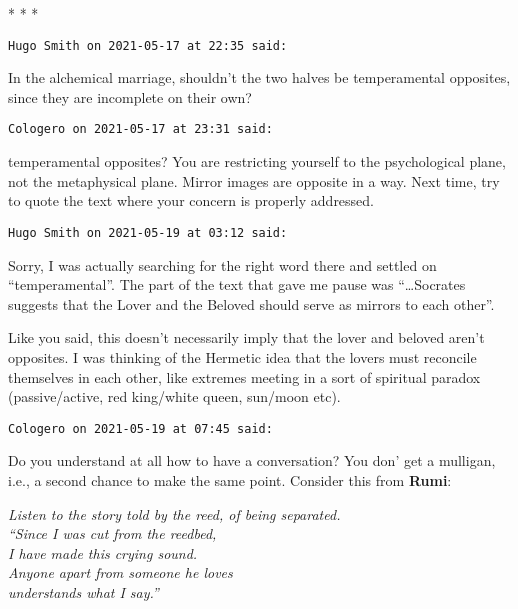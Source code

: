 
\begin{center}* * *\end{center}

\begin{footnotesize}\begin{sffamily}



\texttt{Hugo Smith on 2021-05-17 at 22:35 said: }

In the alchemical marriage, shouldn't the two halves be temperamental opposites, since they are incomplete on their own?


\hfill

\texttt{Cologero on 2021-05-17 at 23:31 said: }

temperamental opposites? You are restricting yourself to the psychological plane, not the metaphysical plane. Mirror images are opposite in a way. Next time, try to quote the text where your concern is properly addressed.


\hfill

\texttt{Hugo Smith on 2021-05-19 at 03:12 said: }

Sorry, I was actually searching for the right word there and settled on “temperamental”. The part of the text that gave me pause was “…Socrates suggests that the Lover and the Beloved should serve as mirrors to each other”.

Like you said, this doesn't necessarily imply that the lover and beloved aren't opposites. I was thinking of the Hermetic idea that the lovers must reconcile themselves in each other, like extremes meeting in a sort of spiritual paradox (passive/active, red king/white queen, sun/moon etc).


\hfill

\texttt{Cologero on 2021-05-19 at 07:45 said: }

Do you understand at all how to have a conversation? You don' get a mulligan, i.e., a second chance to make the same point. Consider this from \textbf{Rumi}:

\begin{quotex}\scriptsize\itshape
Listen to the story told by the reed, of being separated.\\
“Since I was cut from the reedbed,\\
I have made this crying sound.\\
Anyone apart from someone he loves\\
understands what I say.” 


\end{quotex}
\end{sffamily}
\end{footnotesize}

